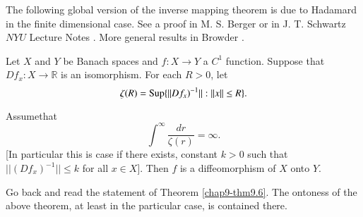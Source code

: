 The following global version of the inverse mapping theorem is due to
Hadamard in the finite dimensional case. See a proof in M. S. Berger
\cite{key10} or in J. T. Schwartz $NYU$ Lecture Notes
\cite{key73}. More general results in Browder \cite{key19}.

\begin{theorem}\label{chap9-thm9.9}
Let $X$ and $Y$ be Banach spaces and $f:X\to Y$ a $C^{1}$
function. Suppose that $Df_{x}:X\to \mathbb{R}$ is an isomorphism. For
each $R>0$, let
$$
\zeta(R)=\operatorname{Sup}\{||Df_{x})^{-1}||:||x||\leq R\}.
$$

Assume\pageoriginale that
$$
\int^{\infty}\frac{dr}{\zeta(r)}=\infty.
$$
[In particular this is case if there exists, constant $k>0$ such that
  $||(Df_{x})^{-1}||\leq k$ for all $x\in X$]. Then $f$ is a
diffeomorphism of $X$ onto $Y$.
\end{theorem}

\begin{remark*}
Go back and read the statement of Theorem \ref{chap9-thm9.6}. The
ontoness of the above theorem, at least in the particular case, is
contained there. 
\end{remark*}

